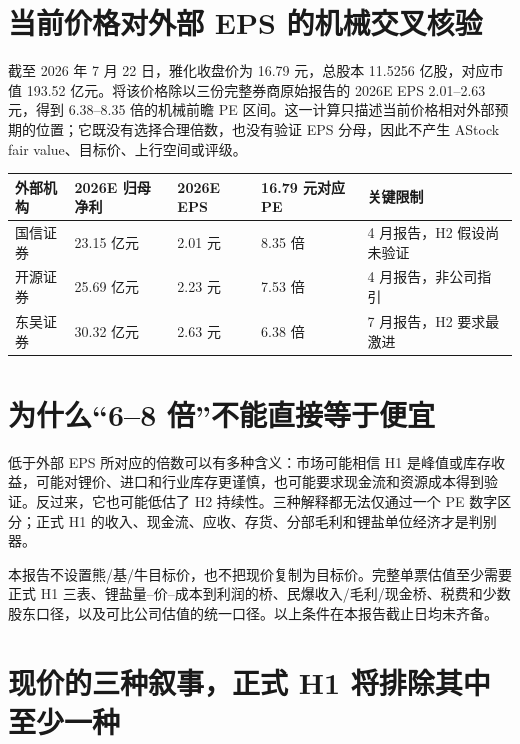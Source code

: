 \section{当前价格对外部 EPS 的机械交叉核验}

截至 2026 年 7 月 22 日，雅化收盘价为 16.79 元，总股本 11.5256 亿股，对应市值 193.52 亿元。将该价格除以三份完整券商原始报告的 2026E EPS 2.01--2.63 元，得到 6.38--8.35 倍的机械前瞻 PE 区间。这一计算只描述当前价格相对外部预期的位置；它既没有选择合理倍数，也没有验证 EPS 分母，因此不产生 AStock fair value、目标价、上行空间或评级。

\begin{exhibitbox}
\begin{tabularx}{\exhibitboxwidth}{L{2.4cm}R{2.5cm}R{2.6cm}R{2.4cm}X}
\toprule
外部机构 & 2026E 归母净利 & 2026E EPS & 16.79 元对应 PE & 关键限制 \\
\midrule
国信证券 & 23.15 亿元 & 2.01 元 & 8.35 倍 & 4 月报告，H2 假设尚未验证 \\
开源证券 & 25.69 亿元 & 2.23 元 & 7.53 倍 & 4 月报告，非公司指引 \\
东吴证券 & 30.32 亿元 & 2.63 元 & 6.38 倍 & 7 月报告，H2 要求最激进 \\
\bottomrule
\end{tabularx}
\end{exhibitbox}

\section{为什么“6--8 倍”不能直接等于便宜}

低于外部 EPS 所对应的倍数可以有多种含义：市场可能相信 H1 是峰值或库存收益，可能对锂价、进口和行业库存更谨慎，也可能要求现金流和资源成本得到验证。反过来，它也可能低估了 H2 持续性。三种解释都无法仅通过一个 PE 数字区分；正式 H1 的收入、现金流、应收、存货、分部毛利和锂盐单位经济才是判别器。

\begin{sourcequalitybox}[估值边界]
本报告不设置熊/基/牛目标价，也不把现价复制为目标价。完整单票估值至少需要正式 H1 三表、锂盐量--价--成本到利润的桥、民爆收入/毛利/现金桥、税费和少数股东口径，以及可比公司估值的统一口径。以上条件在本报告截止日均未齐备。
\end{sourcequalitybox}

\section{现价的三种叙事，正式 H1 将排除其中至少一种}

